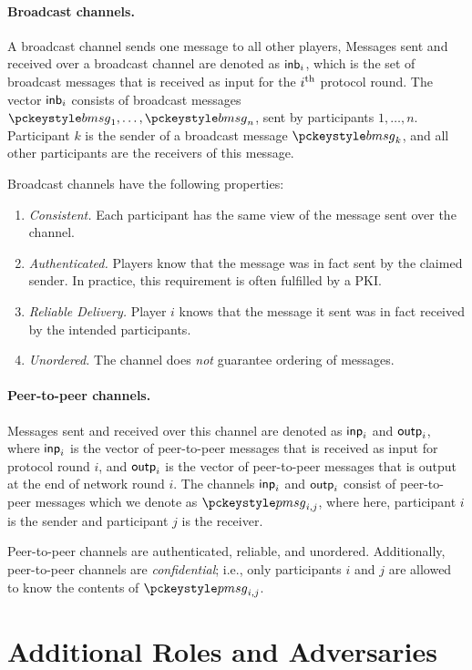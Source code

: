 \paragraph{Broadcast channels.}
A broadcast channel sends one message to all other players,
Messages sent and received over a broadcast channel are denoted as $\mathsf{inb}_i$, which is
the set of broadcast messages that is received as input for the $i^{\textrm{\scriptsize th}}$ protocol round.
The vector $\mathsf{inb}_i$ consists of broadcast messages $\bmsg_1, \ldots, \bmsg_n$,
sent by participants $1, \ldots,n$.
Participant $k$ is the sender of a broadcast message $\bmsg_k$,
and all other participants are the receivers of this message.

Broadcast channels have the following properties:
\begin{enumerate}
  \item \textit{Consistent.} Each participant has the same view of the message sent over the channel.
  \item \textit{Authenticated.} Players know that the message was in fact
  sent by the claimed sender. In practice, this requirement is often fulfilled by a PKI.
  \item \textit{Reliable Delivery.} Player $i$ knows that the message it sent was in fact received by the intended participants.
  \item \textit{Unordered.} The channel does \emph{not} guarantee ordering of messages.
\end{enumerate}

\paragraph{Peer-to-peer channels.}
Messages sent and received over this channel are denoted as $\mathsf{inp}_i$ and $\mathsf{outp}_i$,
where $\mathsf{inp}_i$ is the vector of peer-to-peer messages that is received as input for protocol round $i$,
and $\mathsf{outp}_i$ is the vector of peer-to-peer messages that is output at the end of network round $i$.
The channels $\mathsf{inp}_i$ and $\mathsf{outp}_i$ consist of peer-to-peer messages which we denote as $\pmsg_{i,j}$,
where here, participant $i$ is the sender and participant $j$ is the receiver.

Peer-to-peer channels are authenticated, reliable, and unordered.
Additionally, peer-to-peer channels are \emph{confidential}; i.e.,
only participants $i$ and $j$ are allowed to know the contents of $\pmsg_{i,j}$.

\section{Additional Roles and Adversaries}


